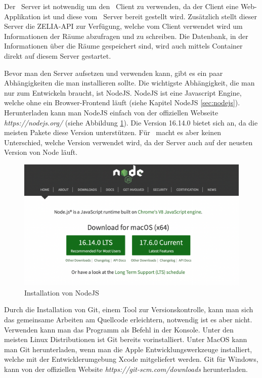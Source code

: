 
Der \ZELIA\ Server ist notwendig um den \ZELIA\ Client zu verwenden, da der Client eine Web-Applikation ist und diese vom \ZELIA\ Server bereit gestellt wird. Zusätzlich stellt dieser Server die ZELIA-API zur Verfügung, welche vom Client verwendet wird um Informationen der Räume abzufragen und zu schreiben. Die Datenbank, in der Informationen über die Räume gespeichert sind, wird auch mittels Container direkt auf diesem Server gestartet.

\begin{minipage}{\textwidth}
    
    Bevor man den Server aufsetzen und verwenden kann, gibt es ein paar Abhängigkeiten die man installieren sollte. Die wichtigste Abhängigkeit, die man nur zum Entwickeln braucht, ist NodeJS. NodeJS ist eine Javascript Engine, welche ohne ein Browser-Frontend läuft (siehe Kapitel NodeJS \ref{sec:nodejs}). Herunterladen kann man NodeJS einfach von der offiziellen Webseite \emph{https://nodejs.org/} (siehe Abbildung \ref{fig:nodejsdownload}). Die Version 16.14.0 bietet sich an, da die meisten Pakete diese Version unterstützen. Für \ZELIA\ macht es aber keinen Unterschied, welche Version verwendet wird, da der Server auch auf der neusten Version von Node läuft.
\end{minipage}
    
\begin{figure}[H]
    \centering
    \includegraphics[width=120mm]{media/Handbuch/nodejs.png}
    \caption{Installation von NodeJS}
    \label{fig:nodejsdownload}
\end{figure}


Durch die Installation von Git, einem Tool zur Versionskontrolle, kann man sich das gemeinsame Arbeiten am Quellcode erleichtern, notwendig ist es aber nicht. Verwenden kann man das Programm als Befehl in der Konsole. Unter den meisten Linux Distributionen ist Git bereits vorinstalliert. Unter MacOS kann man Git herunterladen, wenn man die Apple Entwicklungswerkzeuge installiert, welche mit der Entwicklerumgebung Xcode mitgeliefert werden. Git für Windows, kann von der offiziellen Website \emph{https://git-scm.com/downloads} herunterladen.

